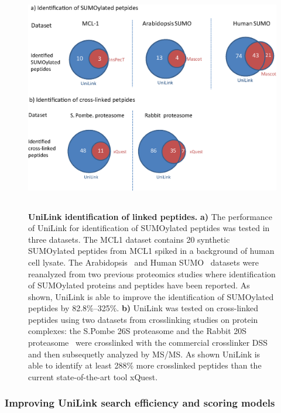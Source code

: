 \documentclass[arial,11pt]{article}
\begin{document}
\begin{figure}[h!]
	\centering
		\includegraphics[height=100mm, width=150mm]{figures/linkedIDs_results.eps}
		\caption{{\bf UniLink identification of linked peptides.} {\footnotesize {\bf a)} The performance of UniLink for identification of SUMOylated peptides was tested in three datasets.  The MCL1 dataset contains 20 synthetic SUMOylated peptides from MCL1 spiked in a background of human cell lysate.  The Arabidopsis~\cite{miller2010humansumo} and Human SUMO~\cite{matic2010site} datasets were reanalyzed from two previous proteomics studies where identification of SUMOylated proteins and peptides have been reported. As shown, UniLink is able to improve the identification of SUMOylated peptides by 82.8\%--325\%. {\bf b)} UniLink was tested on cross-linked peptides using two datasets from crosslinking studies on protein complexes: the S.Pombe 26S proteasome and the Rabbit 20S proteasome~\cite{leitner2012expanding} were crosslinked with the commercial crosslinker DSS and then subsequetly analyzed by MS/MS. As shown UniLink is able to identify at least 288\% more crosslinked peptides than the current state-of-the-art tool xQuest.}}
\label{linkedIds}
\end{figure}

\subsubsection{Improving UniLink search efficiency and scoring models}
\end{document}
